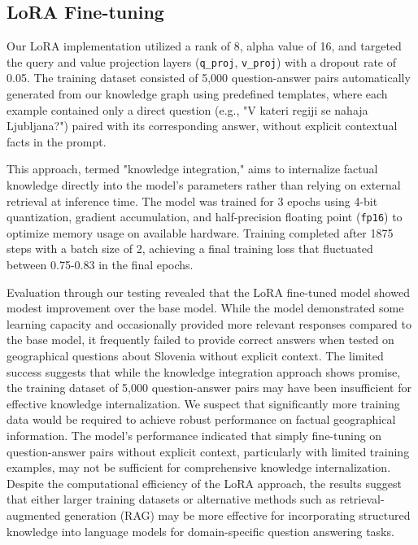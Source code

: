 \documentclass[fleqn,moreauthors,10pt]{ds_report}
\begin{document}
\subsection*{LoRA Fine-tuning}

Our LoRA implementation utilized a rank of 8, alpha value of 16, and targeted the query and value projection layers (\texttt{q\_proj}, \texttt{v\_proj}) with a dropout rate of 0.05. The training dataset consisted of 5,000 question-answer pairs automatically generated from our knowledge graph using predefined templates, where each example contained only a direct question (e.g., "V kateri regiji se nahaja Ljubljana?") paired with its corresponding answer, without explicit contextual facts in the prompt.

This approach, termed "knowledge integration," aims to internalize factual knowledge directly into the model's parameters rather than relying on external retrieval at inference time. The model was trained for 3 epochs using 4-bit quantization, gradient accumulation, and half-precision floating point (\texttt{fp16}) to optimize memory usage on available hardware. Training completed after 1875 steps with a batch size of 2, achieving a final training loss that fluctuated between 0.75-0.83 in the final epochs.

Evaluation through our testing revealed that the LoRA fine-tuned model showed modest improvement over the base model. While the model demonstrated some learning capacity and occasionally provided more relevant responses compared to the base model, it frequently failed to provide correct answers when tested on geographical questions about Slovenia without explicit context. The limited success suggests that while the knowledge integration approach shows promise, the training dataset of 5,000 question-answer pairs may have been insufficient for effective knowledge internalization. We suspect that significantly more training data would be required to achieve robust performance on factual geographical information. The model's performance indicated that simply fine-tuning on question-answer pairs without explicit context, particularly with limited training examples, may not be sufficient for comprehensive knowledge internalization. Despite the computational efficiency of the LoRA approach, the results suggest that either larger training datasets or alternative methods such as retrieval-augmented generation (RAG) may be more effective for incorporating structured knowledge into language models for domain-specific question answering tasks.



\end{document}
